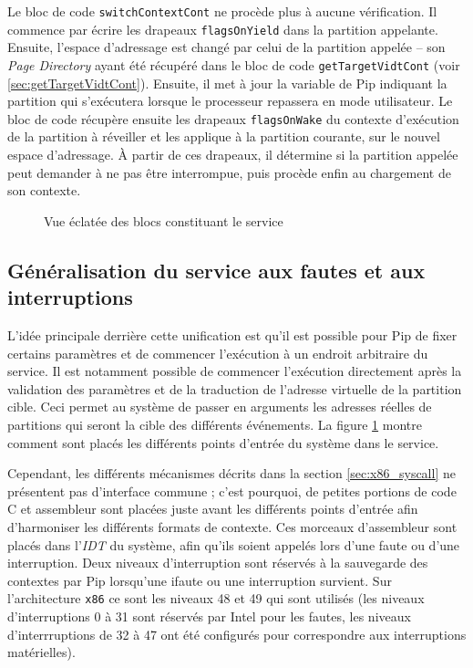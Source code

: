 		Le bloc de code \texttt{switchContextCont} ne procède plus à aucune vérification. Il commence par écrire les drapeaux \texttt{flagsOnYield} dans la partition appelante. Ensuite, l'espace d'adressage est changé par celui de la partition appelée -- son \emph{Page Directory} ayant été récupéré dans le bloc de code \texttt{getTargetVidtCont} (voir \ref{sec:getTargetVidtCont}). Ensuite, il met à jour la variable de Pip indiquant la partition qui s'exécutera lorsque le processeur repassera en mode utilisateur. Le bloc de code récupère ensuite les drapeaux \texttt{flagsOnWake} du contexte d'exécution de la partition à réveiller et les applique à la partition courante, sur le nouvel espace d'adressage. À partir de ces drapeaux, il détermine si la partition appelée peut demander à ne pas être interrompue, puis procède enfin au chargement de son contexte.

		\newpage

		\begin{figure}[!ht]
			
			\caption{Vue éclatée des blocs constituant le service}
			\label{fig:callgraph}
		\end{figure}
		\newpage

		\subsection{Généralisation du service aux fautes et aux interruptions}
		\label{sec:service_generalisation}

		L'idée principale derrière cette unification est qu'il est possible pour Pip de fixer certains paramètres et de commencer l'exécution à un endroit arbitraire du service. Il est notamment possible de commencer l'exécution directement après la validation des paramètres et de la traduction de l'adresse virtuelle de la partition cible. Ceci permet au système de passer en arguments les adresses réelles de partitions qui seront la cible des différents événements. La figure \ref{fig:callgraph} montre comment sont placés les différents points d'entrée du système dans le service.

		Cependant, les différents mécanismes décrits dans la section \ref{sec:x86_syscall} ne présentent pas d'interface commune ; c'est pourquoi, de petites portions de code C et assembleur sont placées juste avant les différents points d'entrée afin d'harmoniser les différents formats de contexte. Ces morceaux d'assembleur sont placés dans l'\emph{IDT} du système, afin qu'ils soient appelés lors d'une faute ou d'une interruption. Deux niveaux d'interruption sont réservés à la sauvegarde des contextes par Pip lorsqu'une ifaute ou une interruption survient. Sur l'architecture \texttt{x86} ce sont les niveaux 48 et 49 qui sont utilisés (les niveaux d'interruptions 0 à 31 sont réservés par Intel pour les fautes, les niveaux d'interrruptions de 32 à 47 ont été configurés pour correspondre aux interruptions matérielles).

